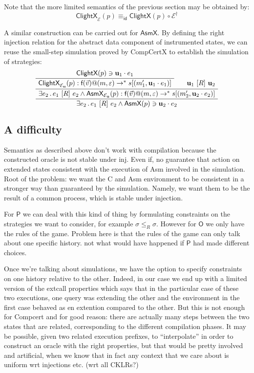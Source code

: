 \documentclass[acmsmall,anonymous]{acmart}
\makeatletter
\newcommand{\kw}[1]{\ensuremath{ \textsf{#1} }}
\newcommand{\ifr}[1]{\ [{#1}]\ }
\newcommand{\mcall}[3]{\kw{#1}({#2})@{#3}}
\makeatother
\begin{document}
Note that the more limited semantics of the previous section
may be obtained by:
\[ \kw{ClightX}_\mathcal{E}(p) \equiv_\kw{id} \kw{ClightX}(p) \circ \mathcal{E}^\dagger \]

A similar construction can be carried out for $\kw{AsmX}$.
By defining the right injection relation
for the abstract data component of instrumented states,
we can reuse the small-step simulation proved by CompCertX
to establish the simulation of strategies:
\[
  \AxiomC{$\kw{ClightX}(p) \ni \mathbf{u}_1 \cdot e_1$}
  \UnaryInfC{$\kw{ClightX}_{\mathcal{E}_\mathbf{u}}(p) :
    \mcall{f}{\vec{v}}{(m, \varepsilon)} \rightarrow^* s[(m_1', \mathbf{u}_1 \cdot e_1)]$}
  \AxiomC{$\mathbf{u}_1 \ifr{R} \mathbf{u}_2$}
  \BinaryInfC{$\exists e_2 \,.\, e_1 \ifr{R} e_2 \wedge
    \kw{AsmX}_{\mathcal{E}_\mathbf{u}}(p) :
      \mcall{f}{\vec{v}}{(m, \varepsilon)} \rightarrow^*
      s[(m_2', \mathbf{u}_2 \cdot e_2)]$}
  \UnaryInfC{$\exists e_2 \,.\, e_1 \ifr{R} e_2 \wedge
    \kw{AsmX}(p) \ni \mathbf{u}_2 \cdot e_2$}
  \DisplayProof
\]

\subsection{A difficulty}

Semantics as described above
don't work with compilation
because the constructed oracle is not stable under inj.
Even if,
no guarantee that action on extended states consistent
with the execution of Asm involved in the simulation.
Root of the problem:
we want the C and Asm environment
to be consistent in a stronger way than
guaranteed by the simulation.
Namely,
we want them to be the result of a common process,
which is stable under injection.

For \kw{P} we can deal with this kind of thing
by formulating constraints on the strategies we want to consider,
for example $\sigma \le_R \sigma$.
However for \kw{O} we only have the rules of the game.
Problem here is that the rules of the game
can only talk about one specific history.
not what would have happened if \kw{P} had made different choices.

Once we're talking about simulations,
we have the option to specify constraints
on one history relative to the other.
Indeed,
in our case we end up with a limited version
of the extcall properties
which says that in the particular case
of these two executions,
one query was extending the other
and the environment in the first case
behaved as en extention compared to the other.
But this is not enough for Compcert and for good reason:
there are actually many steps between the two states
that are related,
corresponding to the different compilation phases.
It may be possible,
given two related execution prefixes,
to ``interpolate'' in order to construct an oracle
with the right properties,
but that would be pretty involved and artificial,
when we know that in fact any context that we care about
is uniform wrt injections etc.
(wrt all CKLRs?)
\end{document}
